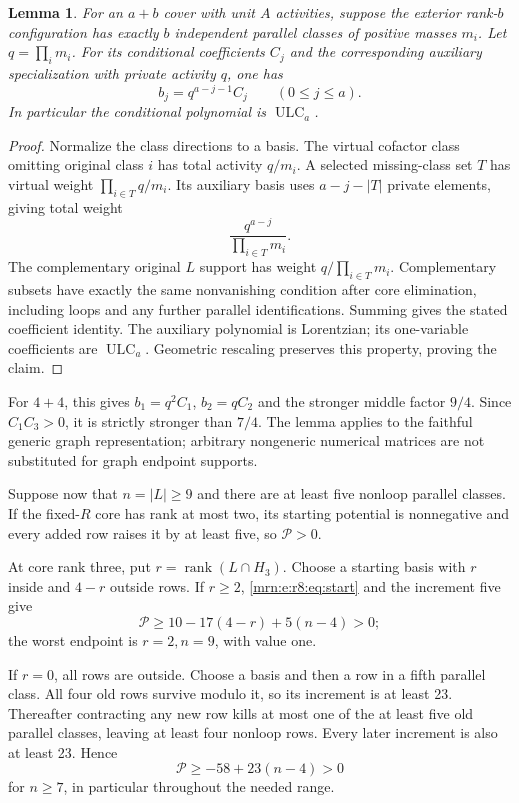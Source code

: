 \documentclass[11pt,a4paper]{article}
\newtheorem{lemma}[theorem]{Lemma}
\theoremstyle{remark}\newtheorem{remark}[theorem]{Remark}
\newcommand{\ULC}{\operatorname{ULC}}      %
\newcommand{\rk}{\operatorname{rank}}      %
\begin{document}
\begin{lemma}\label{mrn:e:r8:lem:parallel}
For an $a+b$ cover with unit $A$ activities, suppose the exterior rank-$b$ configuration has exactly $b$ independent parallel classes of positive masses $m_i$. Let $q=\prod_i m_i$. For its conditional coefficients $C_j$ and the corresponding auxiliary specialization with private activity $q$, one has
\[
 b_j=q^{a-j-1}C_j\qquad(0\le j\le a).
\]
In particular the conditional polynomial is $\ULC_a$.
\end{lemma}
\begin{proof}
Normalize the class directions to a basis. The virtual cofactor class omitting original class $i$ has total activity $q/m_i$. A selected missing-class set $T$ has virtual weight $\prod_{i\in T}q/m_i$. Its auxiliary basis uses $a-j-|T|$ private elements, giving total weight
\[
 \frac{q^{a-j}}{\prod_{i\in T}m_i}.
\]
The complementary original $L$ support has weight $q/\prod_{i\in T}m_i$. Complementary subsets have exactly the same nonvanishing condition after core elimination, including loops and any further parallel identifications. Summing gives the stated coefficient identity. The auxiliary polynomial is Lorentzian; its one-variable coefficients are $\ULC_a$. Geometric rescaling preserves this property, proving the claim.
\end{proof}
For $4+4$, this gives $b_1=q^2C_1$, $b_2=qC_2$ and the stronger middle factor $9/4$. Since $C_1C_3>0$, it is strictly stronger than $7/4$. The lemma applies to the faithful generic graph representation; arbitrary nongeneric numerical matrices are not substituted for graph endpoint supports.

Suppose now that $n=|L|\ge9$ and there are at least five nonloop parallel classes. If the fixed-$R$ core has rank at most two, its starting potential is nonnegative and every added row raises it by at least five, so $\mathcal P>0$.

At core rank three, put $r=\rk(L\cap H_3)$. Choose a starting basis with $r$ inside and $4-r$ outside rows. If $r\ge2$, \eqref{mrn:e:r8:eq:start} and the increment five give
\[
 \mathcal P\ge10-17(4-r)+5(n-4)>0;
\]
the worst endpoint is $r=2,n=9$, with value one.

If $r=0$, all rows are outside. Choose a basis and then a row in a fifth parallel class. All four old rows survive modulo it, so its increment is at least 23. Thereafter contracting any new row kills at most one of the at least five old parallel classes, leaving at least four nonloop rows. Every later increment is also at least 23. Hence
\[
 \mathcal P\ge-58+23(n-4)>0
\]
for $n\ge7$, in particular throughout the needed range.
\end{document}
